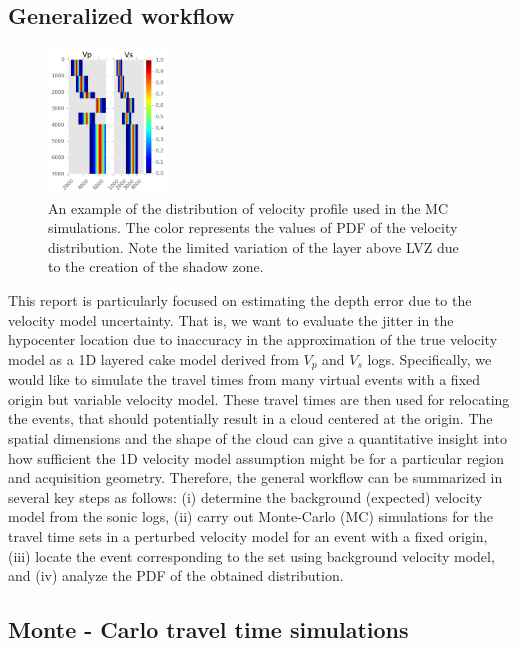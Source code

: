 \documentclass[letterpaper,11pt]{article}
\begin{document}
\subsection*{Generalized workflow}
\begin{figure}
\vspace{-4mm}
\centering
\includegraphics[width=0.28\textwidth]{./AntonBiryukov_bibtex/VpVs.png}
\vspace{-4mm}
\caption{An example of the distribution of velocity profile used in the MC simulations. The color represents the values of PDF of the velocity distribution. Note the limited variation of the layer above LVZ due to the creation of the shadow zone.}
\label{fig:vpvs}
\end{figure}
This report is particularly focused on estimating the depth error due to the velocity model uncertainty. That is, we want to evaluate the jitter in the hypocenter location due to inaccuracy in the approximation of the true velocity model as a 1D layered cake model derived from $V_{p}$ and $V_{s}$ logs. Specifically, we would like to simulate the travel times from many virtual events with a fixed origin but variable velocity model. These travel times are then used for relocating the events, that should potentially result in a cloud centered at the origin. The spatial dimensions and the shape of the cloud can give a quantitative insight into how sufficient the 1D velocity model assumption might be for a particular region and acquisition geometry. Therefore, the general workflow can be summarized in several key steps as follows: (i) determine the background (expected) velocity model from the sonic logs, (ii) carry out Monte-Carlo (MC) simulations for the travel time sets in a perturbed velocity model for an event with a fixed origin, (iii) locate the event corresponding to the set using background velocity model,
and (iv) analyze the PDF of the obtained distribution.

\subsection*{Monte - Carlo travel time simulations}
\end{document}
